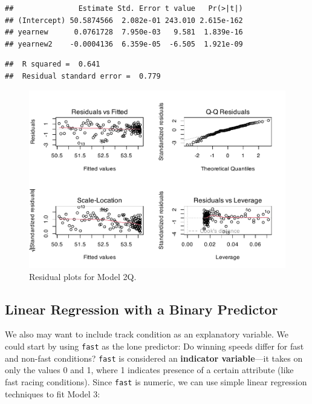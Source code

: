 \documentclass[
]{krantz}
\begin{document}
\begin{verbatim}
##               Estimate Std. Error t value   Pr(>|t|)
## (Intercept) 50.5874566  2.082e-01 243.010 2.615e-162
## yearnew      0.0761728  7.950e-03   9.581  1.839e-16
## yearnew2    -0.0004136  6.359e-05  -6.505  1.921e-09
\end{verbatim}

\begin{verbatim}
##  R squared =  0.641 
##  Residual standard error =  0.779
\end{verbatim}

\begin{figure}

{\centering \includegraphics[width=0.9\linewidth]{bookdown-BeyondMLR_files/figure-latex/resid2q-1} 

}

\caption{Residual plots for Model 2Q.}\label{fig:resid2q}
\end{figure}

\hypertarget{linear-regression-with-a-binary-predictor}{%
\subsection{Linear Regression with a Binary Predictor}\label{linear-regression-with-a-binary-predictor}}

We also may want to include track condition as an explanatory variable. We could start by using \texttt{fast} as the lone predictor: Do winning speeds differ for fast and non-fast conditions? \texttt{fast} is considered an \textbf{indicator variable}---it takes on only the values 0 and 1,  where 1 indicates presence of a certain attribute (like fast racing conditions). Since \texttt{fast} is numeric, we can use simple linear regression techniques to fit Model 3:
\end{document}
